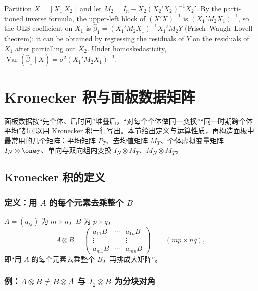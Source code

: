 \begin{english}
Partition $X=[X_1\ X_2]$ and let $M_2=I_n-X_2(X_2'X_2)^{-1}X_2'$. By the partitioned inverse formula, the upper-left block of $(X'X)^{-1}$ is $(X_1'M_2X_1)^{-1}$, so the OLS coefficient on $X_1$ is $\hat\beta_1=(X_1'M_2X_1)^{-1}X_1'M_2Y$ (Frisch--Waugh--Lovell theorem): it can be obtained by regressing the residuals of $Y$ on the residuals of $X_1$ after partialling out $X_2$. Under homoskedasticity, $\operatorname{Var}(\hat\beta_1\mid X)=\sigma^2(X_1'M_2X_1)^{-1}$.
\end{english}

\section{Kronecker 积与面板数据矩阵}\label{sec:U01a-kron}

面板数据按“先个体、后时间”堆叠后，“对每个个体做同一变换”“同一时期跨个体平均”都可以用 Kronecker 积一行写出。本节给出定义与运算性质，再构造面板中最常用的几个矩阵：平均矩阵 $P_T$、去均值矩阵 $M_T$、个体虚拟变量矩阵 $I_N\otimes\one_T$、单向与双向组内变换 $I_N\otimes M_T$、$M_N\otimes M_T$。

\subsection{Kronecker 积的定义}

\subsubsection{定义：用 \texorpdfstring{$A$}{A} 的每个元素去乘整个 \texorpdfstring{$B$}{B}}

\begin{defn}[Kronecker 积]\label{def:U01a-kron}
$A=(a_{ij})$ 为 $m\times n$，$B$ 为 $p\times q$，
\[
A\otimes B=\begin{pmatrix}a_{11}B&\cdots&a_{1n}B\\\vdots&&\vdots\\a_{m1}B&\cdots&a_{mn}B\end{pmatrix}\qquad(mp\times nq),
\]
即“用 $A$ 的每个元素去乘整个 $B$，再排成大矩阵”。
\end{defn}

\subsubsection{例：\texorpdfstring{$A\otimes B\neq B\otimes A$}{A x B != B x A} 与 \texorpdfstring{$I_2\otimes B$}{I x B} 为分块对角}

